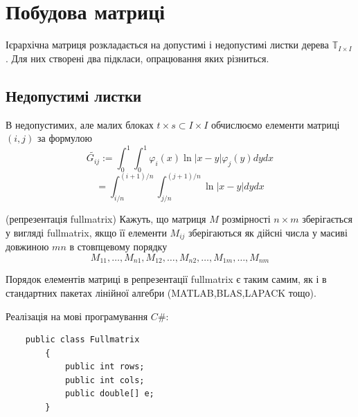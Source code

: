 \documentclass[12pt]{report}
\begin{document}
	\section{Побудова матриці}
	\hspace{0.8cm} Ієрархічна матриця розкладається на допустимі і недопустимі листки дерева $\mathbb{T}_{I\times I}$. Для них створені два підкласи, опрацювання яких різниться.
	\subsection{Недопустимі листки}
	\hspace{0.8cm} В недопустимих, але малих блоках $t\times s\subset I\times I$ обчислюємо елементи матриці $(i,j)$ за формулою
	$$\tilde{G_{ij}}:=\int_{0}^{1}\int_{0}^{1}\varphi_i(x)\ln|x-y|\varphi_j(y)dydx$$$$=\int_{i/n}^{(i+1)/n}\int_{j/n}^{(j+1)/n}\ln|x-y|dydx$$
	\begin{Def}
		(репрезентація fullmatrix) Кажуть, що матриця $M$ розмірності $n\times m$ зберігається у вигляді fullmatrix, якщо її елементи $M_{ij}$ зберігаються як дійсні числа у масиві довжиною $mn$ в стовпцевому порядку
		$$M_{11},\dots,M_{n1},M_{12},\dots,M_{n2},\dots,M_{1m},\dots,M_{nm}$$
	\end{Def}
	\par Порядок елементів матриці в репрезентації fullmatrix є таким самим, як і в стандартних пакетах лінійної алгебри (MATLAB,BLAS,LAPACK тощо).
	\par Реалізація на мові програмування $C\#$:
	\begin{verbatim}
	public class Fullmatrix
	    {
	        public int rows;
	        public int cols;
	        public double[] e;
	    }
	\end{verbatim}
\end{document}
